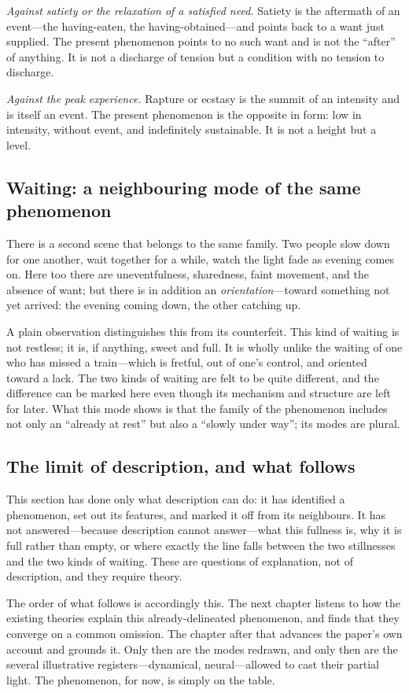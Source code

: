 \emph{Against satiety or the relaxation of a satisfied need.} Satiety is the aftermath of an event---the having-eaten, the having-obtained---and points back to a want just supplied. The present phenomenon points to no such want and is not the ``after'' of anything. It is not a discharge of tension but a condition with no tension to discharge.

\emph{Against the peak experience.} Rapture or ecstasy is the summit of an intensity and is itself an event. The present phenomenon is the opposite in form: low in intensity, without event, and indefinitely sustainable. It is not a height but a level.

\subsection*{Waiting: a neighbouring mode of the same phenomenon}
\label{p19:sub:phen-waiting}

There is a second scene that belongs to the same family. Two people slow down for one another, wait together for a while, watch the light fade as evening comes on. Here too there are uneventfulness, sharedness, faint movement, and the absence of want; but there is in addition an \emph{orientation}---toward something not yet arrived: the evening coming down, the other catching up.

A plain observation distinguishes this from its counterfeit. This kind of waiting is not restless; it is, if anything, sweet and full. It is wholly unlike the waiting of one who has missed a train---which is fretful, out of one's control, and oriented toward a lack. The two kinds of waiting are felt to be quite different, and the difference can be marked here even though its mechanism and structure are left for later. What this mode shows is that the family of the phenomenon includes not only an ``already at rest'' but also a ``slowly under way''; its modes are plural.

\subsection*{The limit of description, and what follows}
\label{p19:sub:phen-limit}

This section has done only what description can do: it has identified a phenomenon, set out its features, and marked it off from its neighbours. It has not answered---because description cannot answer---what this fullness is, why it is full rather than empty, or where exactly the line falls between the two stillnesses and the two kinds of waiting. These are questions of explanation, not of description, and they require theory.

The order of what follows is accordingly this. The next chapter listens to how the existing theories explain this already-delineated phenomenon, and finds that they converge on a common omission. The chapter after that advances the paper's own account and grounds it. Only then are the modes redrawn, and only then are the several illustrative registers---dynamical, neural---allowed to cast their partial light. The phenomenon, for now, is simply on the table.
